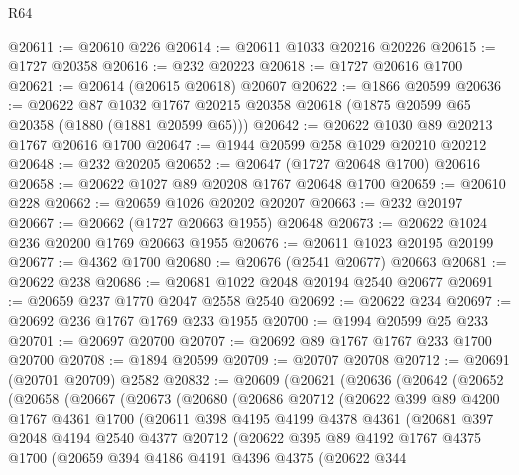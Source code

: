 \begin{lexlean}{R64}
\begin{coremodule}
@20611 := @20610 @226
@20614 := @20611 @1033 @20216 @20226
@20615 := @1727 @20358
@20616 := @232 @20223
@20618 := @1727 @20616 @1700
@20621 := @20614 (@20615 @20618) @20607
@20622 := @1866 @20599
@20636 := @20622
    @87
    @1032
    @1767
    @20215
    @20358
    @20618
    (@1875 @20599 @65 @20358 (@1880 (@1881 @20599 @65)))
@20642 := @20622 @1030 @89 @20213 @1767 @20616 @1700
@20647 := @1944 @20599 @258 @1029 @20210 @20212
@20648 := @232 @20205
@20652 := @20647 (@1727 @20648 @1700) @20616
@20658 := @20622 @1027 @89 @20208 @1767 @20648 @1700
@20659 := @20610 @228
@20662 := @20659 @1026 @20202 @20207
@20663 := @232 @20197
@20667 := @20662 (@1727 @20663 @1955) @20648
@20673 := @20622 @1024 @236 @20200 @1769 @20663 @1955
@20676 := @20611 @1023 @20195 @20199
@20677 := @4362 @1700
@20680 := @20676 (@2541 @20677) @20663
@20681 := @20622 @238
@20686 := @20681 @1022 @2048 @20194 @2540 @20677
@20691 := @20659 @237 @1770 @2047 @2558 @2540
@20692 := @20622 @234
@20697 := @20692 @236 @1767 @1769 @233 @1955
@20700 := @1994 @20599 @25 @233
@20701 := @20697 @20700
@20707 := @20692 @89 @1767 @1767 @233 @1700 @20700
@20708 := @1894 @20599
@20709 := @20707 @20708
@20712 := @20691 (@20701 @20709) @2582
@20832 := @20609
    (@20621
      (@20636
        (@20642
          (@20652
            (@20658
              (@20667
                (@20673
                  (@20680
                    (@20686
                      @20712
                      (@20622
                        @399
                        @89
                        @4200
                        @1767
                        @4361
                        @1700
                        (@20611
                          @398
                          @4195
                          @4199
                          @4378
                          @4361
                          (@20681
                            @397
                            @2048
                            @4194
                            @2540
                            @4377
                            @20712
                            (@20622
                              @395
                              @89
                              @4192
                              @1767
                              @4375
                              @1700
                              (@20659
                                @394
                                @4186
                                @4191
                                @4396
                                @4375
                                (@20622
                                  @344

\end{coremodule}
\end{lexlean}
